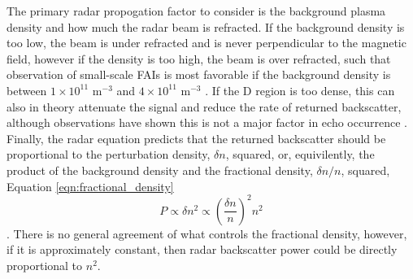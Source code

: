The primary radar propogation factor to consider is the background plasma density and how much the radar beam is refracted.  If the background density is too low, the beam is under refracted and is never perpendicular to the magnetic field, however if the density is too high, the beam is over refracted, such that observation of small-scale FAIs is most favorable if the background density is between \(1\times 10^{11}\) m\(^{-3}\) and \(4\times 10^{11}\) m\(^{-3}\) \citep{Danskin2002,Makarevich2014}.  If the D region is too dense, this can also in theory attenuate the signal and reduce the rate of returned backscatter, although observations have shown this is not a major factor in echo occurrence \citep{Danskin2002}.  Finally, the radar equation predicts that the returned backscatter should be proportional to the perturbation density, \(\delta n\), squared, or, equivilently, the product of the background density and the fractional density, \(\delta n/n\), squared, Equation \ref{eqn:fractional_density}
\begin{equation}
	\label{eqn:fractional_density}
	P \propto \delta n^2 \propto \left(\frac{\delta n}{n}\right)^2 n^2
\end{equation}.
There is no general agreement of what controls the fractional density, however, if it is approximately constant, then radar backscatter power could be directly proportional to \(n^2\).


